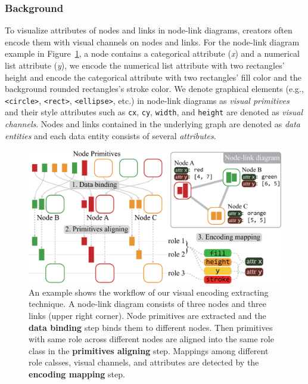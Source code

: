 \subsubsection{Background}
To visualize attributes of nodes and links in node-link diagrams, creators often encode them with visual channels on nodes and links.
For the node-link diagram example in Figure~\ref{fig:VisualEncodings}, a node contains a categorical attribute (\textit{x}) and a numerical list attribute (\textit{y}), we encode the numerical list attribute with two rectangles' height and encode the categorical attribute with two rectangles' fill color and the background rounded rectangles's stroke color.
We denote graphical elements (e.g., \texttt{<circle>}, \texttt{<rect>}, \texttt{<ellipse>}, etc.) in node-link diagrams as \textit{visual primitives} and their style attributes such as \texttt{cx}, \texttt{cy}, \texttt{width}, and \texttt{height} are denoted as \textit{visual channels}.
Nodes and links contained in the underlying graph are denoted as \textit{data entities} and each data entity consists of several \textit{attributes}.

\begin{figure}
    \centering
    \includegraphics[width=1\columnwidth]{figures/VisualEncodings.eps}
    \caption{An example shows the workflow of our visual encoding extracting technique. A node-link diagram consists of three nodes and three links (upper right corner). Node primitives are extracted and the \textbf {data binding} step binds them to different nodes. Then primitives with same role across different nodes are aligned into the same role class in the \textbf{primitives aligning} step. Mappings among different role calsses, visual channels, and attributes are detected by the \textbf{encoding mapping} step.}
    \label{fig:VisualEncodings}
\end{figure}

